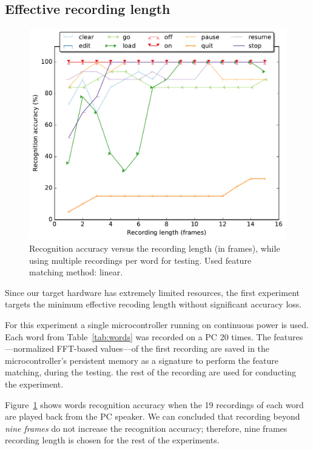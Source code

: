 \subsection{Effective recording length}
\label{subsec:rec_length}
%
\begin{figure}
	\centering
	\includegraphics[width=\linewidth]{"figures/linear_multi"}
	\caption{Recognition accuracy versus the recording length (in frames), while using multiple recordings per word for testing. Used feature matching method: linear.}
	\label{fig:multi}
\end{figure}
%
Since our target hardware has extremely limited resources, the first experiment targets the minimum effective recoding length without significant accuracy loss. 

For this experiment a single microcontroller running on continuous power is used. Each word from Table~\ref{tab:words} was recorded on a PC 20 times. The features---normalized FFT-based values---of the first recording are saved in the microcontroller's persistent memory as a signature to perform the feature matching, during the testing. the rest of the recording are used for conducting the experiment.   

Figure~\ref{fig:multi} shows words recognition accuracy when the 19 recordings of each word are played back from the PC speaker. We can concluded that recording beyond \textit{nine frames} do not increase the recognition accuracy; therefore, nine frames recording length is chosen for the rest of the experiments. 

